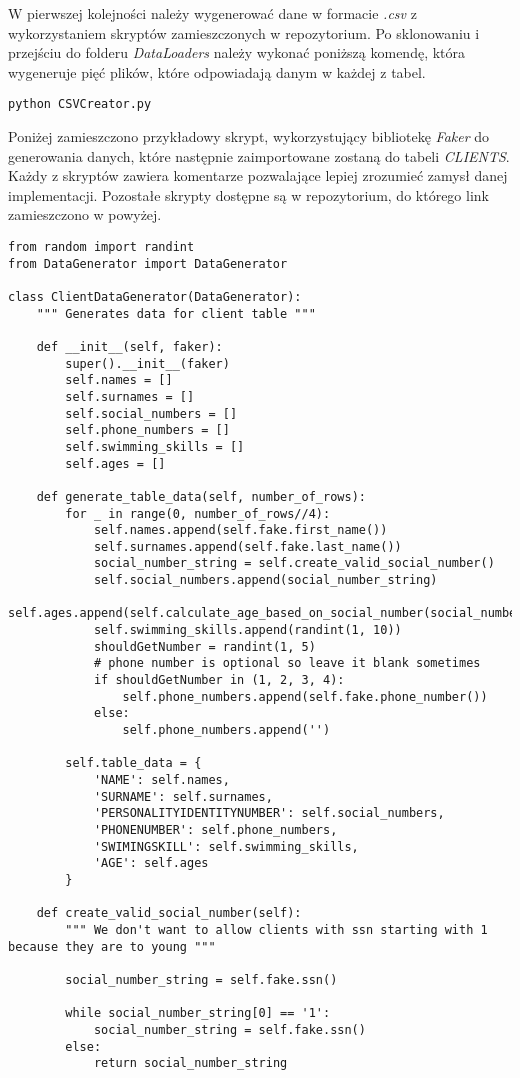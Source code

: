 \documentclass[a4paper]{article}
\begin{document}
W pierwszej kolejności należy wygenerować dane w formacie \textit{.csv} z wykorzystaniem skryptów zamieszczonych w repozytorium. Po sklonowaniu i przejściu do folderu \textit{DataLoaders} należy wykonać poniższą komendę, która wygeneruje pięć plików, które odpowiadają danym w każdej z tabel.

\begin{verbatim}
python CSVCreator.py
\end{verbatim}

Poniżej zamieszczono przykładowy skrypt, wykorzystujący bibliotekę \textit{Faker} do generowania danych, które następnie zaimportowane zostaną do tabeli \textit{CLIENTS}. Każdy z skryptów zawiera komentarze pozwalające lepiej zrozumieć zamysł danej implementacji. Pozostałe skrypty dostępne są w repozytorium, do którego link zamieszczono w powyżej.

\newpage

\begin{verbatim}
from random import randint
from DataGenerator import DataGenerator

class ClientDataGenerator(DataGenerator):
    """ Generates data for client table """

    def __init__(self, faker):
        super().__init__(faker)
        self.names = []
        self.surnames = []
        self.social_numbers = []
        self.phone_numbers = []
        self.swimming_skills = []
        self.ages = []

    def generate_table_data(self, number_of_rows):
        for _ in range(0, number_of_rows//4):
            self.names.append(self.fake.first_name())
            self.surnames.append(self.fake.last_name())
            social_number_string = self.create_valid_social_number()
            self.social_numbers.append(social_number_string)
            self.ages.append(self.calculate_age_based_on_social_number(social_number_string))
            self.swimming_skills.append(randint(1, 10))
            shouldGetNumber = randint(1, 5)
            # phone number is optional so leave it blank sometimes
            if shouldGetNumber in (1, 2, 3, 4):
                self.phone_numbers.append(self.fake.phone_number())
            else:
                self.phone_numbers.append('')

        self.table_data = {
            'NAME': self.names,
            'SURNAME': self.surnames,
            'PERSONALITYIDENTITYNUMBER': self.social_numbers,
            'PHONENUMBER': self.phone_numbers,
            'SWIMINGSKILL': self.swimming_skills,
            'AGE': self.ages
        }

    def create_valid_social_number(self):
        """ We don't want to allow clients with ssn starting with 1 because they are to young """

        social_number_string = self.fake.ssn()

        while social_number_string[0] == '1':
            social_number_string = self.fake.ssn()
        else:
            return social_number_string

\end{verbatim}
\end{document}

